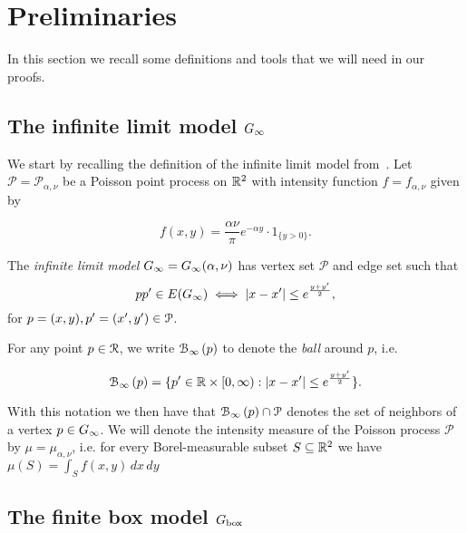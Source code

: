 
\section{Preliminaries\label{sec:proof_outline}}

In this section we recall some definitions and tools that we will need in our proofs.

\subsection{The infinite limit model $G_{\infty}$\label{ssec:infinite_model}}

We start by recalling the definition of the infinite limit model from~\cite{fountoulakis2018law}.
Let $\mathcal{P}=\mathcal{P}_{\alpha,\nu}$ 
be a Poisson point process on ${\mathbb R}^2$ with intensity function $f=f_{\alpha,\nu}$ given by

\begin{equation}\label{eq:def_intensity_function_f}
	f(x,y) = \frac{\alpha \nu}{\pi} e^{-\alpha y} \cdot 1_{\{y>0\}}.
\end{equation} 

The \emph{infinite limit model} $G_{\infty} = G_{\infty}(\alpha,\nu)$ has vertex set $\mathcal{P}$ and edge set such that
\[
	pp' \in E(G_{\infty}) \iff |x - x'| \leq e^{\frac{y + y'}{2}},
\]
for $p=(x,y),p'=(x',y')\in{\mathcal P}$.

For any point $p \in {\mathcal R}$, we write ${\mathcal B}_{\infty}\left(p\right)$ to denote the \emph{ball} around $p$, i.e.

\begin{equation}\label{eq:def_ball_P}
	{\mathcal B}_{\infty}\left(p\right) = \{p^\prime \in {\mathbb R}\times[0,\infty) : |x - x^\prime| \leq e^{\frac{y + y^\prime}{2}}\}.
\end{equation}

With this notation we then have that ${\mathcal B}_{\infty}\left(p\right) \cap {\mathcal P}$ denotes the set of neighbors of a vertex $p \in G_{\infty}$.
We will denote the intensity measure of the Poisson process $\mathcal{P}$ by $\mu = \mu_{\alpha, \nu}$, i.e. for every 
Borel-measurable subset $S \subseteq {\mathbb R}^2$ we have $\mu(S) = \int_S f(x,y) \, dx \, dy$


\subsection{The finite box model $G_{\text{box}}$\label{ssec:finite_model}}


